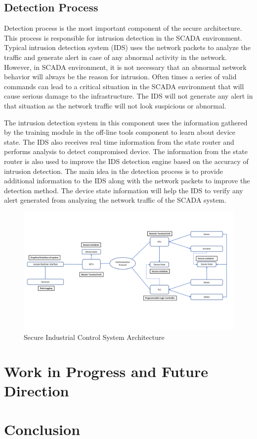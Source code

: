\documentclass[conference]{IEEEtran}
\begin{document}
\subsection{Detection Process}
Detection process is the most important component of the secure architecture. This process is responsible for intrusion detection in the SCADA environment. Typical intrusion detection system (IDS) uses the network packets to analyze the traffic and generate alert in case of any abnormal activity in the network. However, in SCADA environment, it is not necessary that an abnormal network behavior will always be the reason for intrusion. Often times a series of valid commands can lead to a critical situation in the SCADA environment that will cause serious damage to the infrastructure. The IDS will not generate any alert in that situation as the network traffic will not look suspicious or abnormal.
\par The intrusion detection system in this component uses the information gathered by the training module in the off-line tools component to learn about device state. The IDS also receives real time information from the state router and performs analysis to detect compromised device. The information from the state router is also used to improve the IDS detection engine based on the accuracy of intrusion detection. The main idea in the detection process is to provide additional information to the IDS along with the network packets to improve the detection method. The device state information will help the IDS to verify any alert generated from analyzing the network traffic of the SCADA system.  
\begin{figure}[htbp]
\centering
\centerline{\includegraphics [width=.5\textwidth]{sec_arch.png}}
\caption{Secure Industrial Control System Architecture}
\label{fig}
%
\end{figure}
\section{Work in Progress and Future Direction}

\section{Conclusion}
\end{document}

